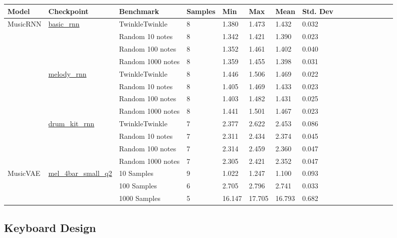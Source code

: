 \begin{minipage}{\linewidth}
    \begin{adjustbox}{width=\textwidth}
        \begin{tabular}{@{}llllllllllllllll@{}|}
            \toprule[1.5pt]
            Model    & Checkpoint                 & Benchmark         & Samples & Min    & Max    & Mean   & Std. Dev \\ \midrule
            MusicRNN & \url{basic\_rnn}           & TwinkleTwinkle    & 8       & 1.380  & 1.473  & 1.432  & 0.032    \\
                     &                            & Random 10 notes   & 8       & 1.342  & 1.421  & 1.390  & 0.023    \\
                     &                            & Random 100 notes  & 8       & 1.352  & 1.461  & 1.402  & 0.040    \\
                     &                            & Random 1000 notes & 8       & 1.359  & 1.455  & 1.398  & 0.031    \\ \midrule
                     & \url{melody\_rnn}          & TwinkleTwinkle    & 8       & 1.446  & 1.506  & 1.469  & 0.022    \\
                     &                            & Random 10 notes   & 8       & 1.405  & 1.469  & 1.433  & 0.023    \\
                     &                            & Random 100 notes  & 8       & 1.403  & 1.482  & 1.431  & 0.025    \\
                     &                            & Random 1000 notes & 8       & 1.441  & 1.501  & 1.467  & 0.023    \\ \midrule
                     & \url{drum\_kit\_rnn}       & TwinkleTwinkle    & 7       & 2.377  & 2.622  & 2.453  & 0.086    \\
                     &                            & Random 10 notes   & 7       & 2.311  & 2.434  & 2.374  & 0.045    \\
                     &                            & Random 100 notes  & 7       & 2.314  & 2.459  & 2.360  & 0.047    \\
                     &                            & Random 1000 notes & 7       & 2.305  & 2.421  & 2.352  & 0.047    \\ \midrule
            MusicVAE & \url{mel\_4bar\_small\_q2} & 10 Samples        & 9       & 1.022  & 1.247  & 1.100  & 0.093    \\
                     &                            & 100 Samples       & 6       & 2.705  & 2.796  & 2.741  & 0.033    \\
                     &                            & 1000 Samples      & 5       & 16.147 & 17.705 & 16.793 & 0.682    \\ \bottomrule[1.5pt]
        \end{tabular}
    \end{adjustbox}
\end{minipage}

\subsection{Keyboard Design}
